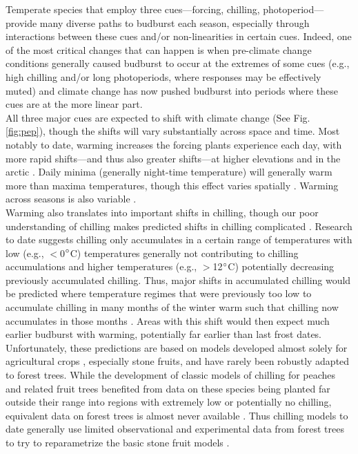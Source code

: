 \documentclass[11pt,letter]{article}
\begin{document}
Temperate species that employ three cues---forcing, chilling, photoperiod---provide many diverse paths to budburst each season, especially through interactions between these cues and/or non-linearities in certain cues. Indeed, one of the most critical changes that can happen is when pre-climate change conditions generally caused budburst to occur at the extremes of some cues (e.g., high chilling and/or long photoperiods, where responses may be effectively muted) and climate change has now pushed budburst into periods where these cues are at the more linear part.\\ 

All three major cues are expected to shift with climate change (See Fig. \ref{fig:pep}), though the shifts will vary substantially across space and time. Most notably to date, warming increases the forcing plants experience each day, with more rapid shifts---and thus also greater shifts---at higher elevations and in the arctic \citep{IPCC:2014sm}. Daily minima (generally night-time temperature) will generally warm more than maxima temperatures, though this effect varies spatially \citep{Alexander:2006qy}. Warming across seasons is also variable \citep{Alexander:2006qy}. \\ %

Warming also translates into important shifts in chilling, though our poor understanding of chilling makes predicted shifts in chilling complicated \citep{chuine2016}. Research to date suggests chilling only accumulates in a certain range of temperatures with low (e.g., $<$0$\degree$C) temperatures generally not contributing to chilling accumulations and higher temperatures (e.g., $>$12$\degree$C) potentially decreasing previously accumulated chilling. Thus, major shifts in accumulated chilling would be predicted where temperature regimes that were previously too low to accumulate chilling in many months of the winter warm such that chilling now accumulates in those months \citep{guy2014}. Areas with this shift would then expect much earlier budburst with warming, potentially far earlier than last frost dates. Unfortunately, these predictions are based on models developed almost solely for agricultural crops \citep[but see][]{harrington2015}, especially stone fruits, and have rarely been robustly adapted to forest trees. While the development of classic models of chilling for peaches and related fruit trees benefited from data on these species being planted far outside their range into regions with extremely low or potentially no chilling, equivalent data on forest trees is almost never available \citep{dennis2003}. Thus chilling models to date generally use limited observational and experimental data from forest trees to try to reparametrize the basic stone fruit models \citep{Chuine2000}.\\
\end{document}
